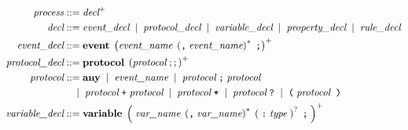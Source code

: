 \documentclass[preview=true]{standalone}
\newcommand{\token}[1]{\textbf{#1}}
\begin{document}
\begin{table}[t]
\newcommand\metasym[1]{{\color{blue}#1}}
\begin{align*}
  \textit{process} &::= \textit{decl}^+
  \\
  \textit{decl} &::=
    \textit{event\_decl}
    \;\mid\; \textit{protocol\_decl}
    \;\mid\; \textit{variable\_decl}
    \;\mid\; \textit{property\_decl}
    \;\mid\; \textit{rule\_decl}
  \\
  \medskip
  \textit{event\_decl} &::=
    \token{event}\;
      \left( \textit{event\_name}\;
        \left(\texttt{,}\; \textit{event\_name}\right)^\ast\; \texttt{;}
      \right)^+
  \\
  \textit{protocol\_decl} &::=
  \token{protocol}\;
   \left(\textit{protocol}\;;;\right)^+
  \\
  \textit{protocol} &::=
  \token{any}\;
  \mid\;
  \textit{event\_name}\;
  \mid\;
  \textit{protocol}\; \texttt{;}\; \textit{protocol}\;
  \\&\quad
  \mid\;
  \textit{protocol}\; \texttt{+}\; \textit{protocol}\;
  \mid\;
  \textit{protocol}\; \texttt{*}\;
  \mid\;
  \textit{protocol}\; \texttt{?}\;
  \mid\;
  \texttt{(}\; \textit{protocol}\;\; \texttt{)}\;
  \\
  \textit{variable\_decl} &::=
  \token{variable}\;
    \left(\;
    \textit{var\_name}\;
    \left(\texttt{,}\; \textit{var\_name}\right)^\ast\;
    \left(\;
    \texttt{:}\; \textit{type}\;
    \right)^?\;
    \texttt{;}\;
    \right)^+
  \\

\end{align*}
\end{table}
\end{document}
